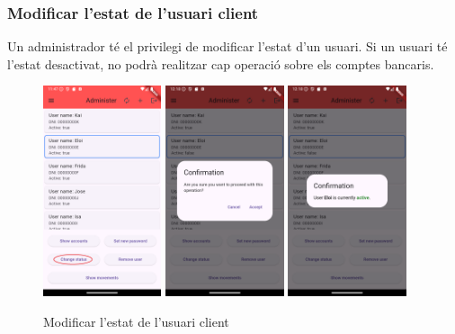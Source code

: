 \documentclass[a4paper,12pt,twoside]{ThesisStyle}
\begin{document}
\clearpage
\subsubsection{Modificar l'estat de l'usuari client}
\label{subsubsec: Modificar l'estat de l'usuari client}

Un administrador té el privilegi de modificar l'estat d'un usuari. Si un usuari té l'estat desactivat, no podrà realitzar cap operació sobre els comptes bancaris.

\begin{figure}[h]
    \centering
    \includegraphics[width=0.31\textwidth]{imatges/mainAdmin3.png}
    \includegraphics[width=0.31\textwidth]{imatges/confirmation.png}
    \includegraphics[width=0.31\textwidth]{imatges/confirmacion1.png}
    \caption{Modificar l'estat de l'usuari client}
    \label{fig: Modificar l'estat de l'usuari client}
\end{figure}
\end{document}
